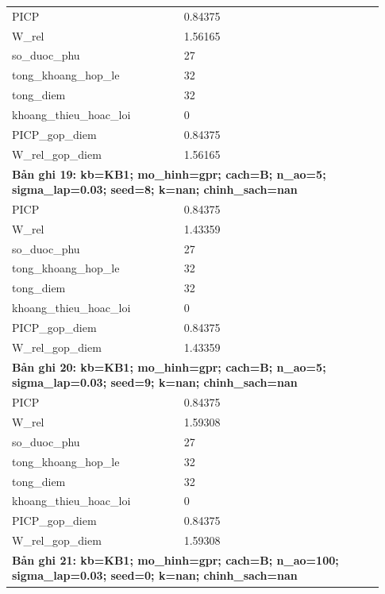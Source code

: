 \begin{longtable}{p{0.43\linewidth}p{0.50\linewidth}}
PICP & 0.84375 \\
W\_\allowbreak rel & 1.56165 \\
so\_\allowbreak duoc\_\allowbreak phu & 27 \\
tong\_\allowbreak khoang\_\allowbreak hop\_\allowbreak le & 32 \\
tong\_\allowbreak diem & 32 \\
khoang\_\allowbreak thieu\_\allowbreak hoac\_\allowbreak loi & 0 \\
PICP\_\allowbreak gop\_\allowbreak diem & 0.84375 \\
W\_\allowbreak rel\_\allowbreak gop\_\allowbreak diem & 1.56165 \\
\midrule
\multicolumn{2}{p{0.95\linewidth}}{\textbf{Bản ghi 19: kb=KB1; mo\_hinh=gpr; cach=B; n\_ao=5; sigma\_lap=0.03; seed=8; k=nan; chinh\_sach=nan}} \\
PICP & 0.84375 \\
W\_\allowbreak rel & 1.43359 \\
so\_\allowbreak duoc\_\allowbreak phu & 27 \\
tong\_\allowbreak khoang\_\allowbreak hop\_\allowbreak le & 32 \\
tong\_\allowbreak diem & 32 \\
khoang\_\allowbreak thieu\_\allowbreak hoac\_\allowbreak loi & 0 \\
PICP\_\allowbreak gop\_\allowbreak diem & 0.84375 \\
W\_\allowbreak rel\_\allowbreak gop\_\allowbreak diem & 1.43359 \\
\midrule
\multicolumn{2}{p{0.95\linewidth}}{\textbf{Bản ghi 20: kb=KB1; mo\_hinh=gpr; cach=B; n\_ao=5; sigma\_lap=0.03; seed=9; k=nan; chinh\_sach=nan}} \\
PICP & 0.84375 \\
W\_\allowbreak rel & 1.59308 \\
so\_\allowbreak duoc\_\allowbreak phu & 27 \\
tong\_\allowbreak khoang\_\allowbreak hop\_\allowbreak le & 32 \\
tong\_\allowbreak diem & 32 \\
khoang\_\allowbreak thieu\_\allowbreak hoac\_\allowbreak loi & 0 \\
PICP\_\allowbreak gop\_\allowbreak diem & 0.84375 \\
W\_\allowbreak rel\_\allowbreak gop\_\allowbreak diem & 1.59308 \\
\midrule
\multicolumn{2}{p{0.95\linewidth}}{\textbf{Bản ghi 21: kb=KB1; mo\_hinh=gpr; cach=B; n\_ao=100; sigma\_lap=0.03; seed=0; k=nan; chinh\_sach=nan}} \\

\end{longtable}

